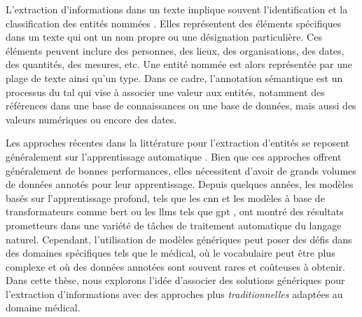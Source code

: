 L'extraction d'informations dans un texte implique souvent l'identification et la classification des entités nommées \cite{alshaikhdeebBiomedicalNamedEntity2016,goyalRecentNamedEntity2018,nasarNamedEntityRecognition2021}.
Elles représentent des éléments spécifiques dans un texte qui ont un nom propre ou une désignation particulière.
Ces éléments peuvent inclure des personnes, des lieux, des organisations, des dates, des quantités, des mesures, etc.
Une entité nommée est alors représentée par une plage de texte ainsi qu'un type.
Dans ce cadre, l'annotation sémantique est un processus du \gls{tal} qui vise à associer une valeur aux entités, notamment des références dans une base de connaissances ou une base de données, mais aussi des valeurs numériques ou encore des dates.

Les approches récentes dans la littérature pour l'extraction d'entités se reposent généralement sur l'apprentissage automatique \cite{nasarNamedEntityRecognition2021}.
Bien que ces approches offrent généralement de bonnes performances, elles nécessitent d'avoir de grands volumes de données annotés pour leur apprentissage.
Depuis quelques années, les modèles basés sur l'apprentissage profond, tels que les \gls{cnn} et les modèles à base de transformateurs comme \gls{bert} \cite{devlinBERTPretrainingDeep2019} ou les \glspl{llm} tels que \gls{gpt} \cite{radfordImprovingLanguageUnderstanding2018, brownLanguageModelsAre2020}, ont montré des résultats prometteurs dans une variété de tâches de traitement automatique du langage naturel.
Cependant, l'utilisation de modèles génériques peut poser des défis dans des domaines spécifiques tels que le médical, où le vocabulaire peut être plus complexe et où des données annotées sont souvent rares et coûteuses à obtenir.
Dans cette thèse, nous explorons l'idée d'associer des solutions génériques pour l'extraction d'informations avec des approches plus \emph{traditionnelles} adaptées au domaine médical.

